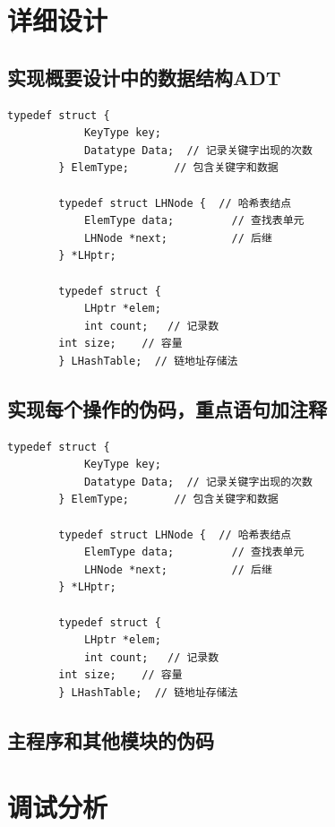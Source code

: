 \documentclass[a4paper]{article}
\begin{document}
    \section{详细设计}\label{sec:design2}

    \subsection{实现概要设计中的数据结构ADT}\label{subsec:adt2}
    \begin{lstlisting}[caption={},label={lst:lstlisting}]
        typedef struct {
            KeyType key;
            Datatype Data;  // 记录关键字出现的次数
        } ElemType;       // 包含关键字和数据

        typedef struct LHNode {  // 哈希表结点
            ElemType data;         // 查找表单元
            LHNode *next;          // 后继
        } *LHptr;

        typedef struct {
            LHptr *elem;
            int count;   // 记录数
        int size;    // 容量
        } LHashTable;  // 链地址存储法
    \end{lstlisting}

    \subsection{实现每个操作的伪码，重点语句加注释}\label{subsec:explain}
    \begin{lstlisting}[caption={},label={lst:lstlisting2}]
        typedef struct {
            KeyType key;
            Datatype Data;  // 记录关键字出现的次数
        } ElemType;       // 包含关键字和数据

        typedef struct LHNode {  // 哈希表结点
            ElemType data;         // 查找表单元
            LHNode *next;          // 后继
        } *LHptr;

        typedef struct {
            LHptr *elem;
            int count;   // 记录数
        int size;    // 容量
        } LHashTable;  // 链地址存储法
    \end{lstlisting}
    \subsection{主程序和其他模块的伪码}\label{subsec:code2}


    \section{调试分析}\label{sec:debug}
\end{document}

